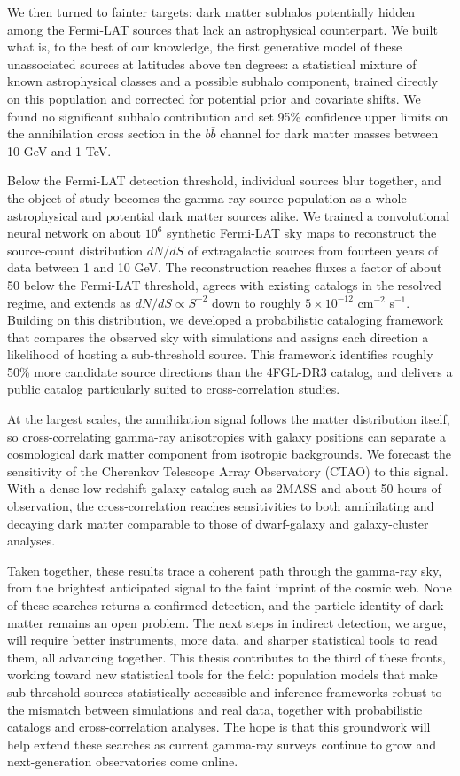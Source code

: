 We then turned to fainter targets: dark matter subhalos potentially hidden among the Fermi-LAT sources that lack an astrophysical counterpart. We built what is, to the best of our knowledge, the first generative model of these unassociated sources at latitudes above ten degrees: a statistical mixture of known astrophysical classes and a possible subhalo component, trained directly on this population and corrected for potential prior and covariate shifts. 
We found no significant subhalo contribution and set 95\% confidence upper limits on the annihilation cross section in the $b\bar{b}$ channel for dark matter masses between 10 GeV and 1 TeV.

Below the Fermi-LAT detection threshold, individual sources blur together, and the object of study becomes the gamma-ray source population as a whole --- astrophysical and potential dark matter sources alike. We trained a convolutional neural network on about $10^6$ synthetic Fermi-LAT sky maps to reconstruct the source-count distribution $dN/dS$ of extragalactic sources from fourteen years of data between 1 and 10 GeV. The reconstruction reaches fluxes a factor of about 50 below the Fermi-LAT threshold, agrees with existing catalogs in the resolved regime, and extends as $dN/dS \propto S^{-2}$ down to roughly $5\times10^{-12}$ cm$^{-2}$ s$^{-1}$. 
Building on this distribution, we developed a probabilistic cataloging framework that compares the observed sky with simulations and assigns each direction a likelihood of hosting a sub-threshold source. This framework identifies roughly 50\% more candidate source directions than the 4FGL-DR3 catalog, and delivers a public catalog particularly suited to cross-correlation studies.

At the largest scales, the annihilation signal follows the matter distribution itself, so cross-correlating gamma-ray anisotropies with galaxy positions can separate a cosmological dark matter component from isotropic backgrounds. We forecast the sensitivity of the Cherenkov Telescope Array Observatory (CTAO) to this signal. With a dense low-redshift galaxy catalog such as 2MASS and about 50 hours of observation, the cross-correlation reaches sensitivities to both annihilating and decaying dark matter comparable to those of dwarf-galaxy and galaxy-cluster analyses.

Taken together, these results trace a coherent path through the gamma-ray sky, from the brightest anticipated signal to the faint imprint of the cosmic web. None of these searches returns a confirmed detection, and the particle identity of dark matter remains an open problem. The next steps in indirect detection, we argue, will require better instruments, more data, and sharper statistical tools to read them, all advancing together. This thesis contributes to the third of these fronts, working toward new statistical tools for the field: population models that make sub-threshold sources statistically accessible and inference frameworks robust to the mismatch between simulations and real data, together with probabilistic catalogs and cross-correlation analyses. The hope is that this groundwork will help extend these searches as current gamma-ray surveys continue to grow and next-generation observatories come online.
